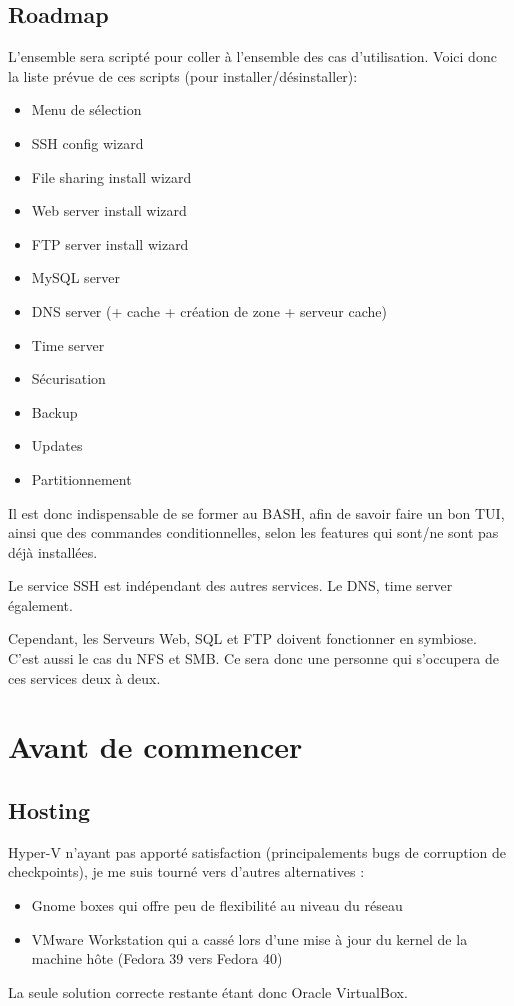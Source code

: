 \documentclass{article}
\begin{document}
\newpage	
	
\subsection{Roadmap}
L'ensemble sera scripté pour coller à l'ensemble des cas d'utilisation. Voici donc la liste prévue de ces scripts (pour installer/désinstaller):
\begin{itemize}
\item Menu de sélection
\item SSH config wizard
			\item File sharing install wizard
			\item Web server install wizard
			\item FTP server install wizard
			\item MySQL server 
			\item DNS server (+ cache + création de zone + serveur cache)
			\item Time server
			\item Sécurisation
			\item Backup
			\item Updates
			\item Partitionnement
		\end{itemize}
		Il est donc indispensable de se former au BASH, afin de savoir faire un bon TUI, ainsi que des commandes conditionnelles, selon les features qui sont/ne sont pas déjà installées.
		
		Le service SSH est indépendant des autres services. Le DNS, time server également.
		
		Cependant, les Serveurs Web, SQL et FTP doivent fonctionner en symbiose. C'est aussi le cas du NFS et SMB. Ce sera donc une personne qui s'occupera de ces services deux à deux.
	
\pagebreak

\section{Avant de commencer}
	
\subsection{Hosting}
	
Hyper-V n'ayant pas apporté satisfaction (principalements bugs de corruption de checkpoints), je me suis tourné vers d'autres alternatives :
\begin{itemize}
\item Gnome boxes qui offre peu de flexibilité au niveau du réseau
\item VMware Workstation qui a cassé lors d'une mise à jour du kernel de la machine hôte (Fedora 39 vers Fedora 40)
\end{itemize}
La seule solution correcte restante étant donc Oracle VirtualBox.
	
\end{document}
